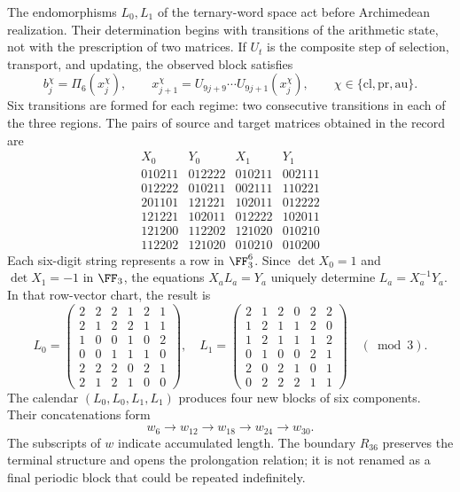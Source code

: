 The endomorphisms \(L_0,L_1\) of the ternary-word space act before Archimedean realization. Their determination begins with transitions of the arithmetic state, not with the prescription of two matrices. If \(U_t\) is the composite step of selection, transport, and updating, the observed block satisfies
\[
 b_j^\chi=\Pi_6(x_j^\chi),\qquad
 x_{j+1}^\chi=U_{9j+9}\cdots U_{9j+1}(x_j^\chi),
 \qquad \chi\in\{\mathrm{cl},\mathrm{pr},\mathrm{au}\}.
\]
Six transitions are formed for each regime: two consecutive transitions in each of the three regions. The pairs of source and target matrices obtained in the record are
\[
\begin{array}{c|c|c|c}
X_0&Y_0&X_1&Y_1\\\hline
010211&012222&010211&002111\\
012222&010211&002111&110221\\
201101&121221&102011&012222\\
121221&102011&012222&102011\\
121200&112202&121020&010210\\
112202&121020&010210&010200
\end{array}
\]
Each six-digit string represents a row in \(\FF_3^6\). Since \(\det X_0=1\) and \(\det X_1=-1\) in \(\FF_3\), the equations \(X_aL_a=Y_a\) uniquely determine \(L_a=X_a^{-1}Y_a\). In that row-vector chart, the result is
\[
 L_0=\begin{pmatrix}
 2&2&2&1&2&1\\2&1&2&2&1&1\\1&0&0&1&0&2\\
 0&0&1&1&1&0\\2&2&2&0&2&1\\2&1&2&1&0&0
 \end{pmatrix},\quad
 L_1=\begin{pmatrix}
 2&1&2&0&2&2\\1&2&1&1&2&0\\1&2&1&1&1&2\\
 0&1&0&0&2&1\\2&0&2&1&0&1\\0&2&2&2&1&1
 \end{pmatrix}\quad(\bmod3).
\]
The calendar \((L_0,L_0,L_1,L_1)\) produces four new blocks of six components. Their concatenations form
\[
 w_6\longrightarrow w_{12}\longrightarrow w_{18}
 \longrightarrow w_{24}\longrightarrow w_{30}.
\]
The subscripts of \(w\) indicate accumulated length. The boundary \(R_{36}\) preserves the terminal structure and opens the prolongation relation; it is not renamed as a final periodic block that could be repeated indefinitely.

